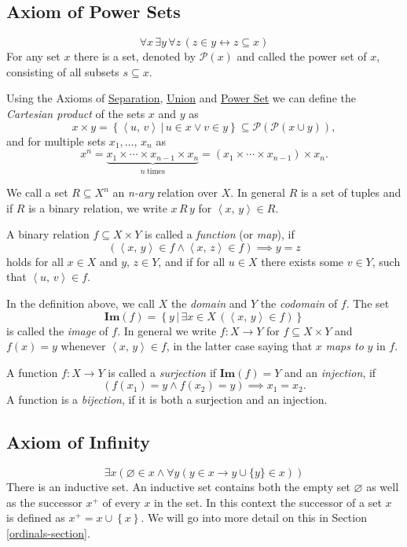 \documentclass[../../main.tex]{subfiles}
\begin{document}
\subsection{Axiom of Power Sets}\label{ZF6}
$$\forall x\, \exists y\, \forall z\, \left(z \in y \leftrightarrow z \subseteq x\right)$$
For any set $x$ there is a set, denoted by $\mathcal{P}(x)$ and called the power set of $x$, consisting of all subsets $s \subseteq x$.

Using the Axioms of \hyperref[ZF3]{Separation}, \hyperref[ZF5]{Union} and \hyperref[ZF6]{Power Set} we can define the \textit{Cartesian product} of the sets $x$ and $y$ as
$$x \times y = \left\{\left<u,\, v\right> \,\vert\, u \in x \vee v \in y\right\} \subseteq \mathcal{P}\left(\mathcal{P}\left(x \cup y\right)\right),$$
and for multiple sets $x_1,\ldots,\, x_n$ as
$$x^n = \underbrace{x_1 \times \cdots \times x_{n-1} \times x_n}_{n\ \text{times}}  = \left(x_1 \times \cdots \times x_{n-1}\right) \times x_n.$$

We call a set $R \subseteq X^n$ an \textit{n-ary} relation over $X$.
In general $R$ is a set of tuples and if $R$ is a binary relation, we write $x\, R\, y$ for $\left<x,\, y\right> \in R$.

A binary relation $f \subseteq X \times Y$ is called a \textit{function} (or \textit{map}), if
$$\left(\left<x,\, y\right> \in f \wedge \left<x,\, z\right> \in f\right) \implies y = z$$
holds for all $x \in X$ and $y,\, z \in Y$, and if for all $u \in X$ there exists some $v \in Y$, such that $\left<u,\, v\right> \in f$.

In the definition above, we call $X$ the \textit{domain} and $Y$ the \textit{codomain} of $f$.
The set
$$\mathbf{Im}(f) = \left\{y \,\vert\, \exists x \in X \, \left(\left<x,\, y\right> \in f\right)\right\}$$
is called the \textit{image} of $f$. 
In general we write $f: X \to Y$ for $f \subseteq X \times Y$ and $f(x) = y$ whenever $\left<x,\, y\right> \in f$, in the latter case saying that $x$ \textit{maps to} $y$ in $f$.

A function $f: X \to Y$ is called a \textit{surjection} if $\mathbf{Im}(f) = Y$
and an \textit{injection}, if $$\left(f(x_1) = y \wedge f(x_2) = y\right) \implies x_1 = x_2.$$ 
A function is a \textit{bijection}, if it is both a surjection and an injection. \cite[pp.7-10]{Jec78}

\subsection{Axiom of Infinity} \label{ZF7}
$$\exists x \left(\varnothing \in x \wedge \forall y \left(y \in x \rightarrow y \cup \{y\} \in x \right)\right)$$
There is an inductive set.
An inductive set contains both the empty set $\varnothing$ as well as the successor $x^+$ of every $x$ in the set.
In this context the successor of a set $x$ is defined as $x^+ = x \cup \left\{x\right\}$.
We will go into more detail on this in Section \ref{ordinals-section}.
\end{document}
